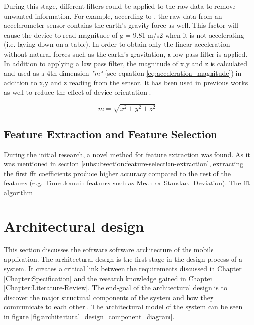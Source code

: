     During this stage, different filters could be applied to the raw data to remove unwanted information. For example, according to \citet[]{googlemotionsensors}, the raw data from an accelerometer sensor contains the earth's gravity force as well. This factor will cause the device to read magnitude of g = 9.81 m/s2 when it is not accelerating (i.e. laying down on a table). In order to obtain only the linear acceleration without natural forces such as the earth's gravitation, a low pass filter is applied. In addition to applying a low pass filter, the magnitude of x,y and z is calculated and used as a 4th dimension \textit{"m"} (see equation \ref{eq:acceleration_magnitude}) in addition to x,y and z reading from the sensor. It has been used in previous works as well to reduce the effect of device orientation \citep[153]{torreshuitzil2015b}.
    
    \begin{equation}
        \label{eq:acceleration_magnitude}
        m = \sqrt{x^2 + y^2 + z^2}
    \end{equation}
    
    \subsection{Feature Extraction and Feature Selection}
    During the initial research, a novel method for feature extraction was found. As it was mentioned in section \ref{subsubsection:feature-selection-extraction}, extracting the first \gls{fft} coefficients produce higher accuracy compared to the rest of the features (e.g. Time domain features such as Mean or Standard Deviation). The \gls{fft} algorithm 
    
        
    \section{Architectural design}
    This section discusses the software software architecture of the mobile application. The architectural design is the first stage in the design process of a system. It creates a critical link between the requirements discussed in Chapter \ref{Chapter:Specification} and the research knowledge gained in Chapter \ref{Chapter:Literature-Review}. The end-goal of the architectural design is to discover the major structural components of the system and how they communicate to each other \citep[148]{sommerville2010}. The architectural model of the system can be seen in figure \ref{fig:architectural_design_component_diagram}.
    
